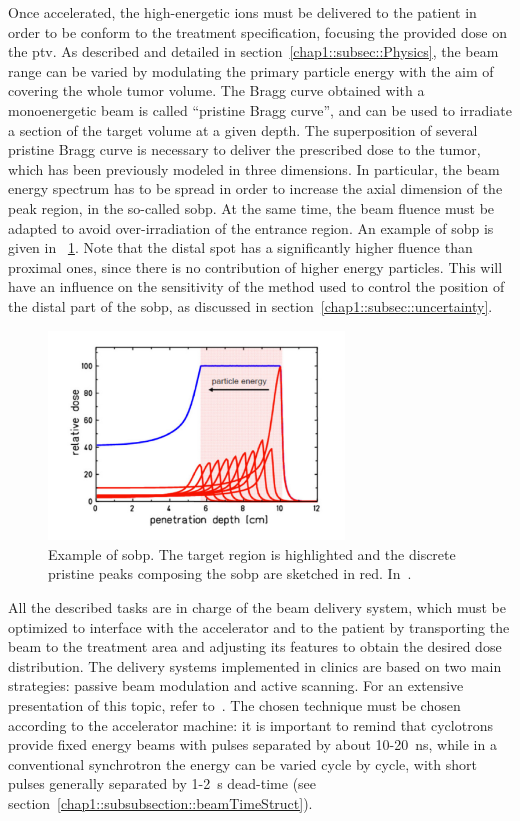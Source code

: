 Once accelerated, the high-energetic ions must be delivered to the patient in order to be conform to the treatment specification, focusing the provided dose on the \gls{ptv}. As described and detailed in section~\ref{chap1::subsec::Physics}, the beam range can be varied by modulating the primary particle energy with the aim of covering the whole tumor volume. The Bragg curve obtained with a monoenergetic beam is called \enquote{pristine Bragg curve}, and can be used to irradiate a section of the target volume at a given depth. The superposition of several pristine Bragg curve is necessary to deliver the prescribed dose to the tumor, which has been previously modeled in three dimensions. In particular, the beam energy spectrum has to be spread in order to increase the axial dimension of the peak region, in the so-called \gls{sobp}. At the same time, the beam fluence must be adapted to avoid over-irradiation of the entrance region. An example of \gls{sobp} is given in \figurename~\ref{chap1::fig::pristine_sobp}. Note that the distal spot has a significantly higher fluence than proximal ones, since there is no contribution of higher energy particles. This will have an influence on the sensitivity of the method used to control the position of the distal part of the \gls{sobp}, as discussed in section~\ref{chap1::subsec::uncertainty}. 

\begin{figure}[!htbp]
\centering
\includegraphics[width=0.7\textwidth]{03_GraphicFiles/chapter1_Introduction/pristine_sobp.pdf}
\caption{Example of \gls{sobp}. The target region is highlighted and the discrete pristine peaks composing the \gls{sobp} are sketched in red. In~\cite{Durante2016}.}
\label{chap1::fig::pristine_sobp}
\end{figure} 

All the described tasks are in charge of the beam delivery system, which must be optimized to interface with the accelerator and to the patient by transporting the beam to the treatment area and adjusting its features to obtain the desired dose distribution. 
The delivery systems implemented in clinics are based on two main strategies: passive beam modulation and active scanning. For an extensive presentation of this topic, refer to~\cite{Gottschalk2008}. The chosen technique must be chosen according to the accelerator machine: it is important to remind that cyclotrons provide fixed energy beams with pulses separated by about 10-20~ns, while in a conventional synchrotron the energy can be varied cycle by cycle, with short pulses generally separated by 1-2~s dead-time (see section~\ref{chap1::subsubsection::beamTimeStruct}). 

